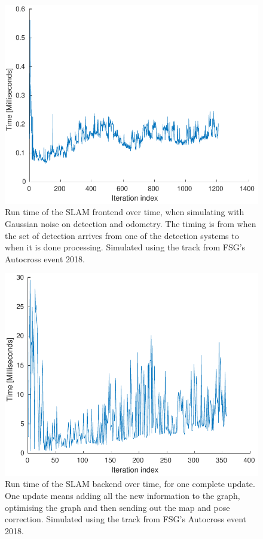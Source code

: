 \begin{figure}
    \centering
    \includegraphics[width=0.8\linewidth]{0_Images/6_Results/FrontendTiming.pdf}
    \caption[Run time of the SLAM frontend.]
    {Run time of the SLAM frontend over time, when simulating with Gaussian noise on detection and odometry. The timing is from when the set of detection arrives from one of the detection systems to when it is done processing. Simulated using the track from FSG's Autocross event 2018.}
    \label{Fig:FrontendTiming}
\end{figure}

\begin{figure}
    \centering
    \includegraphics[width=0.8\linewidth]{0_Images/6_Results/BackendTiming.pdf}
    \caption[Run time of the SLAM backend.]
    {Run time of the SLAM backend over time, for one complete update. One update means adding all the new information to the graph, optimising the graph and then sending out the map and pose correction. Simulated using the track from FSG's Autocross event 2018.}
    \label{Fig:BackendTiming}
\end{figure}

